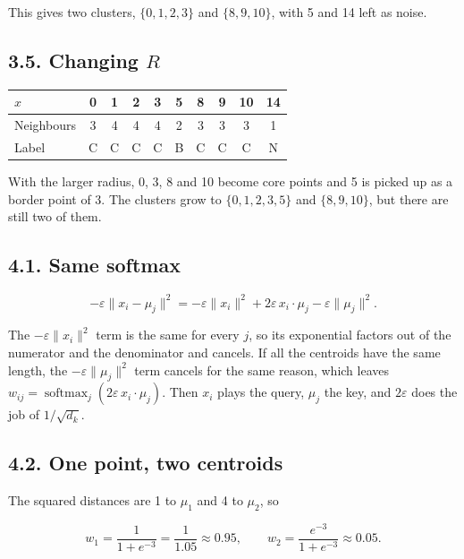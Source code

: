 \documentclass[11pt,a4paper]{article}
\begin{document}
This gives two clusters, $\{0,1,2,3\}$ and $\{8,9,10\}$, with 5 and 14 left as noise.

\subsection*{3.5. Changing $R$}

{\small\setlength{\tabcolsep}{4pt}
\begin{tabularx}{\linewidth}{|l|C|C|C|C|C|C|C|C|C|}
\hline
{}
\textbf{$x$} & \textbf{0} & \textbf{1} & \textbf{2} & \textbf{3} & \textbf{5} & \textbf{8} & \textbf{9} & \textbf{10} & \textbf{14} \\ \hline
Neighbours & 3 & 4 & 4 & 4 & 2 & 3 & 3 & 3 & 1 \\ \hline
Label & C & C & C & C & B & C & C & C & N \\ \hline
\end{tabularx}\par}

With the larger radius, 0, 3, 8 and 10 become core points and 5 is picked up as a border point of 3. The clusters grow to $\{0,1,2,3,5\}$ and $\{8,9,10\}$, but there are still two of them.

\subsection*{4.1. Same softmax}

\[
-\varepsilon\|x_i-\mu_j\|^2=-\varepsilon\|x_i\|^2+2\varepsilon\,x_i\cdot\mu_j-\varepsilon\|\mu_j\|^2.
\]

The $-\varepsilon\|x_i\|^2$ term is the same for every $j$, so its exponential factors out of the numerator and the denominator and cancels. If all the centroids have the same length, the $-\varepsilon\|\mu_j\|^2$ term cancels for the same reason, which leaves $w_{ij}=\operatorname{softmax}_j(2\varepsilon\,x_i\cdot\mu_j)$. Then $x_i$ plays the query, $\mu_j$ the key, and $2\varepsilon$ does the job of $1/\sqrt{d_k}$.

\subsection*{4.2. One point, two centroids}

The squared distances are 1 to $\mu_1$ and 4 to $\mu_2$, so

\[
w_1=\frac{1}{1+e^{-3}}=\frac1{1.05}\approx0.95,\qquad w_2=\frac{e^{-3}}{1+e^{-3}}\approx0.05.
\]
\end{document}
